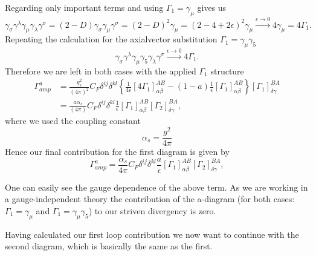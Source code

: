 	Regarding only important terms and using $\Gamma_1 = \gamma_\mu$ gives us
	\begin{equation}
			\gamma_\sigma \gamma^\lambda \gamma_\mu \gamma_\lambda \gamma^\sigma = (2-D)\gamma_\sigma \gamma_\mu \gamma^\sigma = (2-D)^2 \gamma_\mu = (2-4+2\epsilon)^2 \gamma_\mu \xrightarrow[]{\epsilon \to 0} 4 \gamma_\mu = 4\Gamma_1.
	\end{equation}
	Repeating the calculation for the axialvector substitution $\Gamma_1 = \gamma_\mu \gamma_5$	
	\begin{equation}
		\gamma_\sigma \gamma^\lambda \gamma_\mu \gamma_5 \gamma_\lambda \gamma^\sigma \xrightarrow[]{\epsilon \to 0} 4 \Gamma_1.
	\end{equation}
	Therefore we are left in both cases with the applied $\Gamma_1$ structure 
	\begin{equation}
		\begin{split}
			\Gamma^a_{amp} &= \frac{g_s^2}{(4\pi)^2} C_F \delta^{ij}\delta^{kl}\left\{ \frac{1}{4\epsilon} \left[ 4 \Gamma_1 \right]^{AB}_{\alpha\beta} -(1-a) \frac{1}{\epsilon}\left[ \Gamma_1 \right]^{AB}_{\alpha\beta}\right\}\left[ \Gamma_1 \right]^{BA}_{\delta\gamma}  \\
			 &= \frac{a \alpha_s}{(4\pi)} C_F \delta^{ij}\delta^{kl} \frac{1}{\epsilon}\left[ \Gamma_1 \right]^{AB}_{\alpha\beta}\left[ \Gamma_2 \right]^{BA}_{\delta\gamma},
		\end{split}
	\end{equation}	
	where we used the coupling constant  
	\begin{equation}
		\alpha_s = \frac{g^2}{4 \pi}
	\end{equation}
	Hence our final contribution for the first diagram is given by 
	\begin{equation}
		\Gamma^{a}_{amp} =  \frac{\alpha_s}{4\pi} C_F \delta^{ij}\delta^{kl} \frac{a}{\epsilon}\left[ \Gamma_1 \right]^{AB}_{\alpha\beta}\left[ \Gamma_2 \right]^{BA}_{\delta\gamma},
	\end{equation}
	\par
	One can easily see the gauge dependence of the above term. As we are working in a gauge-independent theory the contribution of the a-diagram (for both cases: $\Gamma_1 = \gamma_\mu$ and $\Gamma_1 = \gamma_\mu \gamma_5$) to our striven divergency is zero. \par 
	Having calculated our first loop contribution we now want to continue with the second diagram, which is basically the same as the first. 
